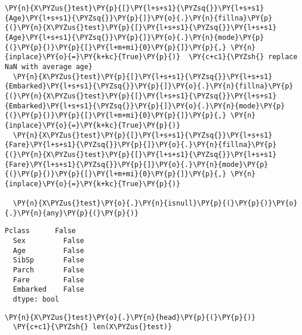       \begin{tcolorbox}[breakable, size=fbox, boxrule=1pt, pad at break*=1mm,colback=cellbackground, colframe=cellborder]
  \begin{Verbatim}[commandchars=\\\{\}]
  \PY{n}{X\PYZus{}test}\PY{p}{[}\PY{l+s+s1}{\PYZsq{}}\PY{l+s+s1}{Age}\PY{l+s+s1}{\PYZsq{}}\PY{p}{]}\PY{o}{.}\PY{n}{fillna}\PY{p}{(}\PY{n}{X\PYZus{}test}\PY{p}{[}\PY{l+s+s1}{\PYZsq{}}\PY{l+s+s1}{Age}\PY{l+s+s1}{\PYZsq{}}\PY{p}{]}\PY{o}{.}\PY{n}{mode}\PY{p}{(}\PY{p}{)}\PY{p}{[}\PY{l+m+mi}{0}\PY{p}{]}\PY{p}{,} \PY{n}{inplace}\PY{o}{=}\PY{k+kc}{True}\PY{p}{)}  \PY{c+c1}{\PYZsh{} replace NaN with average age}
  \PY{n}{X\PYZus{}test}\PY{p}{[}\PY{l+s+s1}{\PYZsq{}}\PY{l+s+s1}{Embarked}\PY{l+s+s1}{\PYZsq{}}\PY{p}{]}\PY{o}{.}\PY{n}{fillna}\PY{p}{(}\PY{n}{X\PYZus{}test}\PY{p}{[}\PY{l+s+s1}{\PYZsq{}}\PY{l+s+s1}{Embarked}\PY{l+s+s1}{\PYZsq{}}\PY{p}{]}\PY{o}{.}\PY{n}{mode}\PY{p}{(}\PY{p}{)}\PY{p}{[}\PY{l+m+mi}{0}\PY{p}{]}\PY{p}{,} \PY{n}{inplace}\PY{o}{=}\PY{k+kc}{True}\PY{p}{)}
  \PY{n}{X\PYZus{}test}\PY{p}{[}\PY{l+s+s1}{\PYZsq{}}\PY{l+s+s1}{Fare}\PY{l+s+s1}{\PYZsq{}}\PY{p}{]}\PY{o}{.}\PY{n}{fillna}\PY{p}{(}\PY{n}{X\PYZus{}test}\PY{p}{[}\PY{l+s+s1}{\PYZsq{}}\PY{l+s+s1}{Fare}\PY{l+s+s1}{\PYZsq{}}\PY{p}{]}\PY{o}{.}\PY{n}{mode}\PY{p}{(}\PY{p}{)}\PY{p}{[}\PY{l+m+mi}{0}\PY{p}{]}\PY{p}{,} \PY{n}{inplace}\PY{o}{=}\PY{k+kc}{True}\PY{p}{)}

  \PY{n}{X\PYZus{}test}\PY{o}{.}\PY{n}{isnull}\PY{p}{(}\PY{p}{)}\PY{o}{.}\PY{n}{any}\PY{p}{(}\PY{p}{)}
  \end{Verbatim}
  \end{tcolorbox}

              \begin{tcolorbox}[breakable, size=fbox, boxrule=.5pt, pad at break*=1mm, opacityfill=0]
  \begin{Verbatim}[commandchars=\\\{\}]
  Pclass      False
  Sex         False
  Age         False
  SibSp       False
  Parch       False
  Fare        False
  Embarked    False
  dtype: bool
  \end{Verbatim}
  \end{tcolorbox}
          
      \begin{tcolorbox}[breakable, size=fbox, boxrule=1pt, pad at break*=1mm,colback=cellbackground, colframe=cellborder]
  \begin{Verbatim}[commandchars=\\\{\}]
  \PY{n}{X\PYZus{}test}\PY{o}{.}\PY{n}{head}\PY{p}{(}\PY{p}{)}
  \PY{c+c1}{\PYZsh{} len(X\PYZus{}test)}
  \end{Verbatim}
  \end{tcolorbox}

